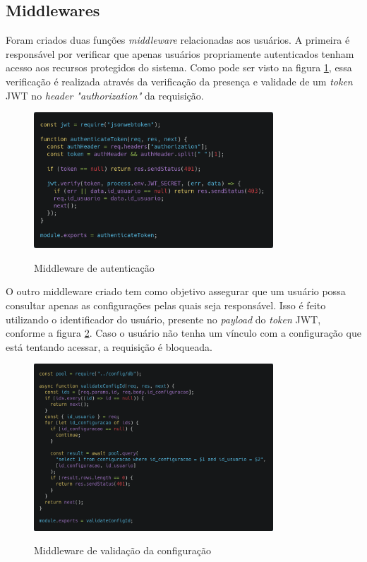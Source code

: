 \subsection{Middlewares}
Foram criados duas funções \textit{middleware} relacionadas aos usuários. A primeira é responsável por verificar que apenas usuários propriamente autenticados tenham acesso aos recursos protegidos do sistema. Como pode ser visto na figura \ref{fig:auth}, essa verificação é realizada através da verificação da presença e validade de um \textit{token} JWT no \textit{header "authorization"} da requisição.

\begin{figure}[!htb]
	\centering
	\caption{Middleware de autenticação}
	\includegraphics[width=0.8\textwidth]{./dados/figuras/authMiddleware}
	\label{fig:auth}
\end{figure}
\pagebreak

O outro middleware criado tem como objetivo assegurar que um usuário possa consultar apenas as configurações pelas quais seja responsável. Isso é feito utilizando o identificador do usuário, presente no \textit{payload} do \textit{token} JWT, conforme a figura \ref{fig:configMiddleware}. Caso o usuário não tenha um vínculo com a configuração que está tentando acessar, a requisição é bloqueada.

\begin{figure}[!htb]
	\centering
	\caption{Middleware de validação da configuração}
	\includegraphics[width=0.8\textwidth]{./dados/figuras/configMiddleware}
	\label{fig:configMiddleware}
\end{figure}
\pagebreak


